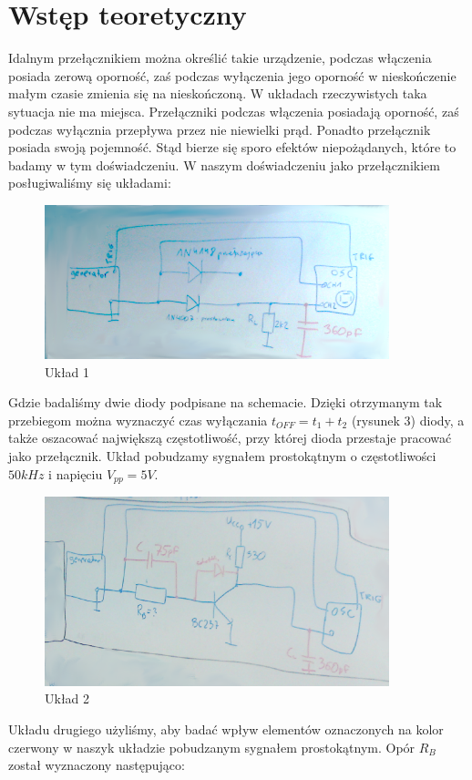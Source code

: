 \documentclass[a4paper,11pt]{article}
\begin{document}
\section{Wstęp teoretyczny}

Idalnym przełącznikiem można określić takie urządzenie, podczas włączenia posiada zerową oporność, zaś podczas wyłączenia jego oporność w nieskończenie małym czasie zmienia się na nieskończoną. W układach rzeczywistych taka sytuacja nie ma miejsca. Przełączniki podczas włączenia posiadają oporność, zaś podczas wyłącznia przepływa przez nie niewielki prąd. Ponadto przełącznik posiada swoją pojemność. Stąd bierze się sporo efektów niepożądanych, które to badamy w tym doświadczeniu. W naszym doświadczeniu jako przełącznikiem posługiwaliśmy się układami: 
\begin{figure} [H]
  \begin{center}
    \includegraphics[width = 10cm]{../Obrazki_i_tekst/obrobione/u1.png}
    \caption{Układ 1}
  \end{center}
\end{figure}
Gdzie badaliśmy dwie diody podpisane na schemacie. Dzięki otrzymanym tak przebiegom można wyznaczyć czas wyłączania 
 $ t_{OFF} = t_1 + t_2 $ (rysunek 3) diody, a także oszacować największą częstotliwość, przy której dioda przestaje pracować jako przełącznik.  Układ pobudzamy sygnałem prostokątnym o częstotliwości $50 kHz$ i napięciu $V_{pp}=	5 V$.



\begin{figure} [H]
  \begin{center}
    \includegraphics[width = 10cm]{../Obrazki_i_tekst/obrobione/u2.png}
    \caption{Układ 2}
  \end{center}
\end{figure}
Układu drugiego użyliśmy, aby badać wpływ elementów oznaczonych na kolor czerwony w naszyk układzie pobudzanym sygnałem prostokątnym. Opór $R_B$ został wyznaczony następująco: 
\end{document}

